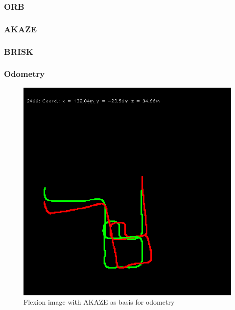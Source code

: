 \subsubsection{ORB}
\subsubsection{AKAZE}
\subsubsection{BRISK}
\subsubsection{Odometry}

\begin{figure}[H]
    \includegraphics[width=0.5\linewidth]{chapter06/odo/jonas_flexion_AKAZE.png}
    \caption{Flexion image with AKAZE as basis for odometry}
\end{figure}
